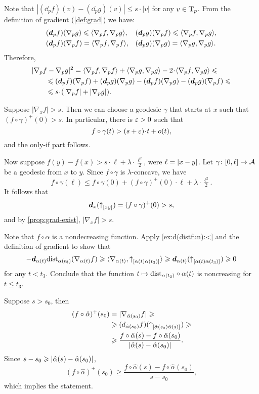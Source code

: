 Note that
$|(\dd_p f)(v)-(\dd_p g)(v)|\le s\cdot|v|$
for any $v\in \mathrm{T}_p$.
From the definition of gradient (\ref{def:grad}) we have:
\begin{align*}
&(\bm{d}_p f)(\nabla_p g)\leqslant\langle\nabla_p f,\nabla_p g\rangle,
&&(\bm{d}_p g)(\nabla_p f)\leqslant\langle\nabla_p f,\nabla_p g\rangle,
\\
&(\bm{d}_p f)(\nabla_p f)=\langle\nabla_p f,\nabla_p f\rangle,
&&(\bm{d}_p g)(\nabla_p g)=\langle\nabla_p g,\nabla_p g\rangle.
\end{align*}
Therefore,
\begin{align*}
&\dist[2]{\nabla_pf}{\nabla_pg}{}
=\<\nabla_p f,\nabla_p f\>+\<\nabla_p g,\nabla_p g\>-2\cdot\<\nabla_p f,\nabla_p g\>
\le
\\
&\qquad\le (\dd_p f)(\nabla_p f)+(\dd_p g)(\nabla_p g)-
(\dd_p f)(\nabla_p g)-(\dd_p g)(\nabla_p f)
\le
\\
&\qquad\le s\cdot(|\nabla_p f|+|\nabla_p g|).
\end{align*}

Suppose $|\nabla_xf|> s$.
Then we can choose a geodesic $\gamma$ that starts at $x$ such that 
$(f\circ\gamma)^+(0)>s$.
In particular, there is $\varepsilon>0$ such that
\[f\circ\gamma(t)>(s+\eps)\cdot t+o(t),\]
and the only-if part follows.

Now suppose $f(y)-f(x)>s\cdot \ell+\lambda\cdot \tfrac{\ell^2}2$,
were $\ell=|{x}-{y}|_{}^{{}}$.
Let $\gamma\colon[0,\ell]\to \mathcal{A}$ be a geodesic from $x$ to $y$.
Since $f\circ\gamma$ is $\lambda$-concave, we have
\[f\circ\gamma(\ell)\le f\circ\gamma(0)+(f\circ\gamma)^+(0)\cdot\ell+\lambda\cdot \tfrac{\ell^2}2.\]
It follows that 
\[\bm{d}_x({\uparrow}_{[{x}{y}]_{{}}})=(f\circ\gamma)^+(0)>s,\]
and by \ref{prop:grad-exist}, $|\nabla_x f|>s$.

Note that $f\circ\alpha$ is a nondecreasing function.
Apply \ref{ex:d(distfun):<} and the definition of gradient to show that
\[
-\bm{d}_{\alpha(t)}\mathrm{dist}_{\alpha(t_3)}(\nabla_{\alpha(t)}f)
\geqslant
\langle \nabla_{\alpha(t)},{\uparrow}_{[{\alpha(t)}{\alpha(t_3)}]_{{}}}\rangle
\geqslant
\bm{d}_{\alpha(t)}({\uparrow}_{[{\alpha(t)}{\alpha(t_3)}]_{{}}})
\geqslant0
\]
for any $t<t_3$.
Conclude that the function 
$t\mapsto \mathrm{dist}_{\alpha(t_3)}\circ\alpha(t)$ is noncreasing for $t\le t_3$.

Suppose $s>s_0$, then
\begin{align*}
(f\circ\hat\alpha)^+(s_0)&=|\nabla_{\hat\alpha(s_0)}f|
\geqslant
\\
&\geqslant
(d_{\hat\alpha(s_0)}f)({\uparrow}_{[{\hat\alpha(s_0)}{\hat\alpha(s)}]_{{}}})
\geqslant
\\
&\geqslant
\frac{f\circ\hat\alpha(s)-f\circ\hat\alpha(s_0)}{|{\hat\alpha(s)}-{\hat\alpha(s_0)}|_{}^{{}}}.
\end{align*} 
Since $s-s_0\geqslant|{\hat\alpha(s)}-{\hat\alpha(s_0)}|_{}^{{}}$,
\[(f\circ\hat\alpha)^+(s_0)\ge
\frac{f\circ\hat\alpha(s)-f\circ\hat\alpha(s_0)}{s-s_0},\]
which implies the statement.

